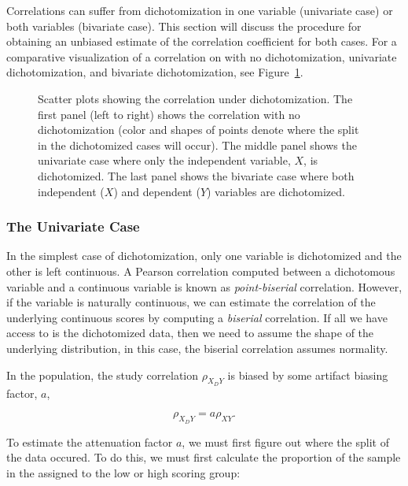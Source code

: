 \documentclass[
  letterpaper,
  DIV=11,
  numbers=noendperiod]{scrreprt}
\begin{document}
Correlations can suffer from dichotomization in one variable (univariate
case) or both variables (bivariate case). This section will discuss the
procedure for obtaining an unbiased estimate of the correlation
coefficient for both cases. For a comparative visualization of a
correlation on with no dichotomization, univariate dichotomization, and
bivariate dichotomization, see Figure~\ref{fig-dich-cases}.

\begin{figure}[H]


\caption{\label{fig-dich-cases}Scatter plots showing the correlation
under dichotomization. The first panel (left to right) shows the
correlation with no dichotomization (color and shapes of points denote
where the split in the dichotomized cases will occur). The middle panel
shows the univariate case where only the independent variable, \(X\), is
dichotomized. The last panel shows the bivariate case where both
independent (\(X\)) and dependent (\(Y\)) variables are dichotomized.}

\end{figure}%

\subsubsection*{The Univariate Case}\label{the-univariate-case}

In the simplest case of dichotomization, only one variable is
dichotomized and the other is left continuous. A Pearson correlation
computed between a dichotomous variable and a continuous variable is
known as \emph{point-biserial} correlation. However, if the variable is
naturally continuous, we can estimate the correlation of the underlying
continuous scores by computing a \emph{biserial} correlation. If all we
have access to is the dichotomized data, then we need to assume the
shape of the underlying distribution, in this case, the biserial
correlation assumes normality.

In the population, the study correlation \(\rho_{X_D Y}\) is biased by
some artifact biasing factor, \(a\),

\[
\rho_{X_D Y} = a\rho_{XY}.
\]

To estimate the attenuation factor \(a\), we must first figure out where
the split of the data occured. To do this, we must first calculate the
proportion of the sample in the assigned to the low or high scoring
group:
\end{document}
